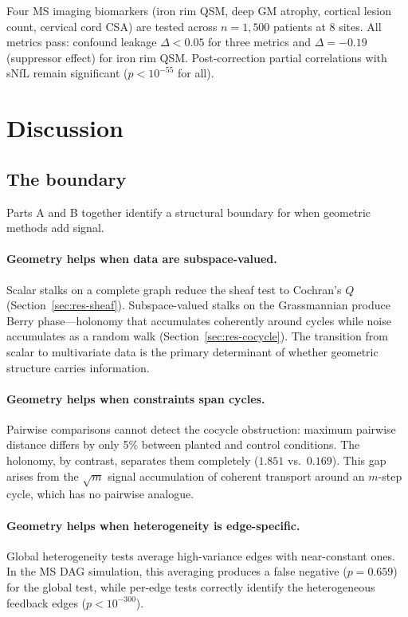 \documentclass[11pt]{article}
\begin{document}
Four MS imaging biomarkers (iron rim QSM, deep GM atrophy, cortical lesion count, cervical cord CSA) are tested across $n = 1{,}500$ patients at 8 sites.
All metrics pass: confound leakage $\Delta < 0.05$ for three metrics and $\Delta = -0.19$ (suppressor effect) for iron rim QSM.
Post-correction partial correlations with sNfL remain significant ($p < 10^{-55}$ for all).

\section{Discussion}
\label{sec:discussion}

\subsection{The boundary}

Parts A and B together identify a structural boundary for when geometric methods add signal.

\paragraph{Geometry helps when data are subspace-valued.}
Scalar stalks on a complete graph reduce the sheaf test to Cochran's $Q$ (Section~\ref{sec:res-sheaf}).
Subspace-valued stalks on the Grassmannian produce Berry phase---holonomy that accumulates coherently around cycles while noise accumulates as a random walk (Section~\ref{sec:res-cocycle}).
The transition from scalar to multivariate data is the primary determinant of whether geometric structure carries information.

\paragraph{Geometry helps when constraints span cycles.}
Pairwise comparisons cannot detect the cocycle obstruction: maximum pairwise distance differs by only 5\% between planted and control conditions.
The holonomy, by contrast, separates them completely ($1.851$ vs.\ $0.169$).
This gap arises from the $\sqrt{m}$ signal accumulation of coherent transport around an $m$-step cycle, which has no pairwise analogue.

\paragraph{Geometry helps when heterogeneity is edge-specific.}
Global heterogeneity tests average high-variance edges with near-constant ones.
In the MS DAG simulation, this averaging produces a false negative ($p = 0.659$) for the global test, while per-edge tests correctly identify the heterogeneous feedback edges ($p < 10^{-300}$).
\end{document}

